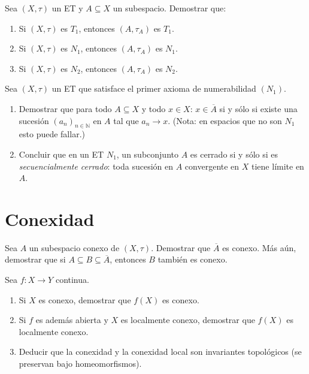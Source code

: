 \documentclass{article}
\theoremstyle{definition}
\newcommand{\N}{\mathbb{N}}
\newcommand{\cl}[1]{\overline{#1}}              %
\newenvironment{ejercicio}[1]{\begin{trivlist}
\item[\hskip \labelsep {\bfseries Ejercicio}\hskip \labelsep {\bfseries #1.}]}{\end{trivlist}}
\begin{document}
\begin{ejercicio}{3}
    Sea \((X, \tau)\) un ET y \(A \subseteq X\) un subespacio. Demostrar que:
    \begin{enumerate}
        \item Si \((X, \tau)\) es \(T_1\), entonces \((A, \tau_A)\) es \(T_1\).
        \item Si \((X, \tau)\) es \(N_1\), entonces \((A, \tau_A)\) es \(N_1\).
        \item Si \((X, \tau)\) es \(N_2\), entonces \((A, \tau_A)\) es \(N_2\).
    \end{enumerate}
\end{ejercicio}

\begin{ejercicio}{4}
    Sea \((X, \tau)\) un ET que satisface el primer axioma de numerabilidad \((N_1)\).
    \begin{enumerate}
        \item Demostrar que para todo \(A \subseteq X\) y todo \(x \in X\): \( x \in \cl{A} \) si y sólo si existe una sucesión \({(a_n)}_{n \in \N}\) en \(A\) tal que \(a_n \to x\). (Nota: en espacios que no son \(N_1\) esto puede fallar.)
        \item Concluir que en un ET \(N_1\), un subconjunto \(A\) es cerrado si y sólo si es \textit{secuencialmente cerrado}: toda sucesión en \(A\) convergente en \(X\) tiene límite en \(A\).
    \end{enumerate}
\end{ejercicio}

\clearpage

\section{Conexidad}

\begin{ejercicio}{5}
    Sea \(A\) un subespacio conexo de \((X, \tau)\). Demostrar que \(\cl{A}\) es conexo. Más aún, demostrar que si \(A \subseteq B \subseteq \cl{A}\), entonces \(B\) también es conexo.
\end{ejercicio}

\begin{ejercicio}{6}
    Sea \(f : X \to Y\) continua.
    \begin{enumerate}
        \item Si \(X\) es conexo, demostrar que \(f(X)\) es conexo.
        \item Si \(f\) es además abierta y \(X\) es localmente conexo, demostrar que \(f(X)\) es localmente conexo.
        \item Deducir que la conexidad y la conexidad local son invariantes topológicos (se preservan bajo homeomorfismos).
    \end{enumerate}
\end{ejercicio}
\end{document}

